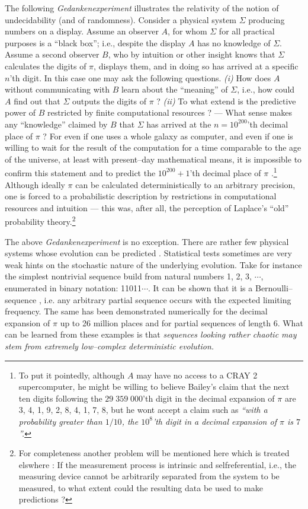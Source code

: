       The following {\it Gedankenexperiment} illustrates the relativity
 of the notion of undecidability (and of randomness).  Consider a
 physical system $\Sigma$ producing numbers on a display.  Assume an
 observer $A$, for whom $\Sigma$ for all practical purposes is a
 ``black box''; i.e., despite the display $A$ has no knowledge of
 $\Sigma$.  Assume a second observer $B$, who by intuition or other
 insight knows that $\Sigma$ calculates the digits of $\pi$, displays
 them, and in doing so has arrived at a specific $n$'th digit.  In this
 case one may ask the following questions. {\it (i)} How does $A$
 without communicating with $B$ learn about the ``meaning'' of
 $\Sigma$,
 i.e., how could $A$ find out that $\Sigma$ outputs the digits of $\pi$
 ? {\it (ii)} To what extend is the predictive power of $B$ restricted
 by finite computational resources ? --- What sense makes
  any ``knowledge'' claimed by $B$ that $\Sigma$
 has arrived
 at the $n=10^{200}$'th decimal place of $\pi$ ?
 For even if one uses a whole galaxy as computer,
 and even if one is willing to wait for the result of the computation
 for a time comparable to the age of the universe, at least with
 present--day
 mathematical means, it is impossible to confirm this statement
 and to predict the $10^{200}+1$'th decimal place of $\pi$
 \cite{gandy1,gandy2}.\footnote{  To put
 it pointedly, although $A$ may have no access to a CRAY 2
 supercomputer, he might be willing to believe Bailey's claim
 \cite{bailey1}
 that the next ten digits following the $29 \;359 \;000$'th digit in
 the decimal expansion of $\pi$ are 3, 4, 1, 9, 2, 8, 4, 1, 7, 8, but
 he wont accept a claim such as {\it ``with a probability greater than
 $1/10$, the $10^8$'th digit in a decimal expansion of $\pi$ is $7
 $''.}} Although ideally $\pi$ can be calculated deterministically to
 an
 arbitrary precision, one is forced to a probabilistic description by
 restrictions in computational
 resources and intuition --- this was, after all, the perception of
 Laplace's ``old''
 probability theory.\footnote{ For completeness another problem will be
 mentioned here which is treated elswhere \cite{svozil1}: If the
 measurement
 process is intrinsic and selfreferential, i.e., the measuring device
 cannot be arbitrarily separated from the system to be measured,
 to what extent could the resulting data be used to make predictions ?}

      The above {\it Gedankenexperiment} is no exception.  There are
 rather few physical systems whose evolution can be predicted
 \cite{ford1}.  Statistical tests sometimes are very weak hints on the
 stochastic nature of the underlying evolution.  Take for instance the
 simplest nontrivial sequence build from natural numbers 1, 2, 3,
 $\cdots$, enumerated in binary notation: 11011$\cdots$.  It can be
 shown that it is a Bernoulli--sequence \cite{ch1}, i.e. any arbitrary
 partial sequence occurs with the expected limiting frequency.  The
 same has been
 demonstrated numerically \cite{bailey1} for the decimal expansion of
 $\pi$
 up to 26 million places and for partial sequences of length 6. What
 can be learned from these examples is that {\sl sequences looking
 rather chaotic may stem from extremely low--complex deterministic
 evolution.}

